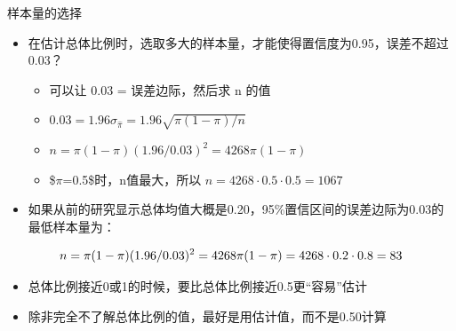 \documentclass[presentation]{beamer}
\begin{document}
\begin{frame}[label={sec:orgb371788}]{样本量的选择}
\begin{itemize}
\item 在估计总体比例时，选取多大的样本量，才能使得置信度为0.95，误差不超过0.03？

\begin{itemize}
\item 可以让 0.03 = 误差边际，然后求 n 的值

\item \(0.03=1.96\sigma_{\hat \pi}=1.96\sqrt{\pi (1-\pi) / n}\)

\item \(n=\pi (1-\pi)(1.96/0.03)^2=4268\pi (1-\pi)\)

\item \$\(\pi\)=0.5\$时，n值最大，所以 \(n=4268\cdot 0.5\cdot 0.5=1067\)
\end{itemize}
\item 如果从前的研究显示总体均值大概是0.20，95\%置信区间的误差边际为0.03的最低样本量为：
\end{itemize}

$$n=\pi (1-\pi)(1.96/0.03)^2=4268\pi (1-\pi) \\ =4268\cdot 0.2 \cdot 0.8=83$$

\begin{itemize}
\item 总体比例接近0或1的时候，要比总体比例接近0.5更“容易”估计

\item 除非完全不了解总体比例的值，最好是用估计值，而不是0.50计算
\end{itemize}
\end{frame}
\end{document}
